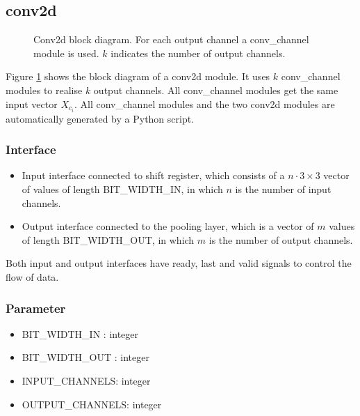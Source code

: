 \subsection{conv2d}

\begin{figure}[h]
	\centering
	
	\caption[Conv2d block diagram.]{Conv2d block diagram. For each output channel a conv\_channel module is used. $k$ indicates the number of output channels.}
	\label{FIG:conv2d}
\end{figure}
Figure \ref{FIG:conv2d} shows the block diagram of a conv2d module. It uses $k$ conv\_channel modules to realise $k$ output channels. 
All conv\_channel modules get the same input vector $X_{c_i}$. All conv\_channel modules
and the two conv2d modules are automatically generated by a Python script.
\subsubsection{Interface}
\begin{itemize}
	\item Input interface connected to shift register, which consists of a $n \cdot 3 \times 3$ vector of values of length BIT\_WIDTH\_IN, in which $n$ is the number of input channels.
	\item Output interface connected to the pooling layer, which is a vector of $m$ values of length BIT\_WIDTH\_OUT, in which $m$ is the number of output channels.
\end{itemize}
Both input and output interfaces have ready, last and valid signals to control the flow of data.
\subsubsection{Parameter}
\begin{itemize}
 	\item BIT\_WIDTH\_IN : integer
 	\item BIT\_WIDTH\_OUT : integer
 	\item INPUT\_CHANNELS: integer
 	\item OUTPUT\_CHANNELS: integer
\end{itemize}